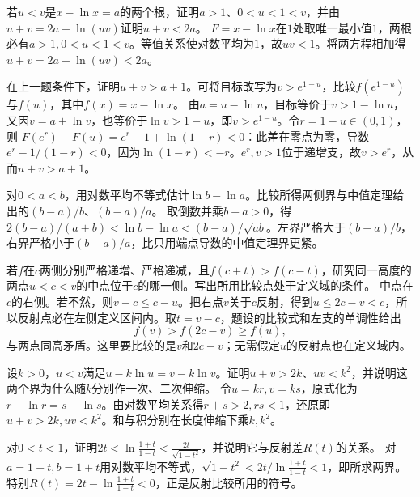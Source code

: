 若\(u<v\)是\(x-\ln x=a\)的两个根，证明\(a>1\)、\(0<u<1<v\)，并由\(u+v=2a+\ln(uv)\)证明\(u+v<2a\)。
\solutionanswer
\(F=x-\ln x\)在\(1\)处取唯一最小值\(1\)，两根必有\(a>1,0<u<1<v\)。等值关系使对数平均为\(1\)，故\(uv<1\)。将两方程相加得\(u+v=2a+\ln(uv)<2a\)。


在上一题条件下，证明\(u+v>a+1\)。可将目标改写为\(v>e^{1-u}\)，比较\(f(e^{1-u})\)与\(f(u)\)，其中\(f(x)=x-\ln x\)。
\solutionanswer
由\(a=u-\ln u\)，目标等价于\(v>1-\ln u\)，又因\(v=a+\ln v\)，也等价于\(\ln v>1-u\)，即\(v>e^{1-u}\)。令\(r=1-u\in(0,1)\)，则
\(F(e^r)-F(u)=e^r-1+\ln(1-r)<0\)：此差在零点为零，导数\(e^r-1/(1-r)<0\)，因为\(\ln(1-r)<-r\)。\(e^r,v>1\)位于递增支，故\(v>e^r\)，从而\(u+v>a+1\)。


对\(0<a<b\)，用对数平均不等式估计\(\ln b-\ln a\)。比较所得两侧界与中值定理给出的\((b-a)/b\)、\((b-a)/a\)。
\solutionanswer
取倒数并乘\(b-a>0\)，得\(2(b-a)/(a+b)<\ln b-\ln a<(b-a)/\sqrt{ab}\)。左界严格大于\((b-a)/b\)，右界严格小于\((b-a)/a\)，比只用端点导数的中值定理界更紧。


若\(f\)在\(c\)两侧分别严格递增、严格递减，且\(f(c+t)>f(c-t)\)，研究同一高度的两点\(u<c<v\)的中点位于\(c\)的哪一侧。写出所用比较点处于定义域的条件。
\solutionanswer
中点在\(c\)的右侧。若不然，则\(v-c\le c-u\)。把右点\(v\)关于\(c\)反射，得到\(u\le 2c-v<c\)，所以反射点必在左侧定义区间内。取\(t=v-c\)，题设的比较式和左支的单调性给出
\[
 f(v)>f(2c-v)\ge f(u),
\]
与两点同高矛盾。这里要比较的是\(v\)和\(2c-v\)；无需假定\(u\)的反射点也在定义域内。


设\(k>0\)，\(u<v\)满足\(u-k\ln u=v-k\ln v\)。证明\(u+v>2k\)、\(uv<k^2\)，并说明这两个界为什么随\(k\)分别作一次、二次伸缩。
\solutionanswer
令\(u=kr,v=ks\)，原式化为\(r-\ln r=s-\ln s\)。由对数平均关系得\(r+s>2,rs<1\)，还原即\(u+v>2k,uv<k^2\)。和与积分别在长度伸缩下乘\(k,k^2\)。


对\(0<t<1\)，证明\(2t<\ln\frac{1+t}{1-t}<\frac{2t}{\sqrt{1-t^2}}\)，并说明它与反射差\(R(t)\)的关系。
\solutionanswer
对\(a=1-t,b=1+t\)用对数平均不等式，\(\sqrt{1-t^2}<2t/\ln\frac{1+t}{1-t}<1\)，即所求两界。特别\(R(t)=2t-\ln\frac{1+t}{1-t}<0\)，正是反射比较所用的符号。


